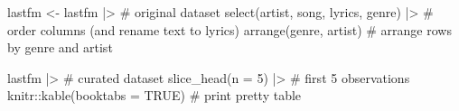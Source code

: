 \documentclass[
  letterpaper,
]{latex/krantz}
\newenvironment{Shaded}{\begin{snugshade}}{\end{snugshade}}
\newcommand{\AttributeTok}[1]{\textcolor[rgb]{0.40,0.45,0.13}{#1}}
\newcommand{\CommentTok}[1]{\textcolor[rgb]{0.37,0.37,0.37}{#1}}
\newcommand{\ConstantTok}[1]{\textcolor[rgb]{0.56,0.35,0.01}{#1}}
\newcommand{\DecValTok}[1]{\textcolor[rgb]{0.68,0.00,0.00}{#1}}
\newcommand{\FunctionTok}[1]{\textcolor[rgb]{0.28,0.35,0.67}{#1}}
\newcommand{\NormalTok}[1]{\textcolor[rgb]{0.00,0.23,0.31}{#1}}
\newcommand{\OtherTok}[1]{\textcolor[rgb]{0.00,0.23,0.31}{#1}}
\newcommand{\SpecialCharTok}[1]{\textcolor[rgb]{0.37,0.37,0.37}{#1}}
\begin{document}
\begin{Shaded}
\begin{Highlighting}[]
\NormalTok{lastfm }\OtherTok{\textless{}{-}} 
\NormalTok{  lastfm }\SpecialCharTok{|\textgreater{}} \CommentTok{\# original dataset}
  \FunctionTok{select}\NormalTok{(artist, song, lyrics, genre) }\SpecialCharTok{|\textgreater{}} \CommentTok{\# order columns (and rename \textasciigrave{}text\textasciigrave{} to \textasciigrave{}lyrics\textasciigrave{})}
  \FunctionTok{arrange}\NormalTok{(genre, artist) }\CommentTok{\# arrange rows by \textasciigrave{}genre\textasciigrave{} and \textasciigrave{}artist\textasciigrave{}}

\NormalTok{lastfm }\SpecialCharTok{|\textgreater{}} \CommentTok{\# curated dataset}
  \FunctionTok{slice\_head}\NormalTok{(}\AttributeTok{n =} \DecValTok{5}\NormalTok{) }\SpecialCharTok{|\textgreater{}} \CommentTok{\# first 5 observations}
\NormalTok{  knitr}\SpecialCharTok{::}\FunctionTok{kable}\NormalTok{(}\AttributeTok{booktabs =} \ConstantTok{TRUE}\NormalTok{) }\CommentTok{\# print pretty table}
\end{Highlighting}
\end{Shaded}
\end{document}
